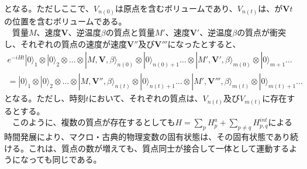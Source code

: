 となる。ただしここで、$V_{n(0)}$は原点を含むボリュームであり、$V_{n(t)}$は、が$\mathbf{V}t$の位置を含むボリュームである。\\
　質量$M$、速度$\mathbf{V}$、逆温度$\beta$の質点と質量$M'$、速度$\mathbf{V}'$、逆温度$\beta$の質点が衝突し、それぞれの質点の速度が速度$\mathbf{V}''$及び$\mathbf{V}'''$になったとすると、
\begin{equation}
\begin{aligned}
    e^{-iHt}|0\rangle_1 \otimes |0\rangle_2 \otimes \ldots \otimes |M,\mathbf{V},\beta \rangle_{n(0)} \otimes |0\rangle_{n(0)+1} \ldots \otimes |M',\mathbf{V}',\beta \rangle_{m(0)} \otimes |0\rangle_{m+1} \ldots \\
    =  |0\rangle_{1} \otimes |0\rangle_{2} \otimes \ldots \otimes |M,\mathbf{V}'',\beta \rangle_{n(t)} \otimes |0\rangle_{n(t)+1} \ldots
    \otimes |M',\mathbf{V}''',\beta \rangle_{m(t)} \otimes |0\rangle_{m(t)+1} \ldots 
\end{aligned}
\end{equation}
となる。ただし、時刻$t$において、それぞれの質点は、$V_{n(t)}$及び$V_{m(t)}$に存在するとする。\\
　このように、複数の質点が存在するとしても$H=\sum_pH_p^a+ \sum_{p \neq q} H^{int}_{p,q}$による時間発展により、マクロ・古典的物理変数の固有状態は、その固有状態であり続ける。これは、質点の数が増えても、質点同士が接合して一体として運動するようになっても同じである。